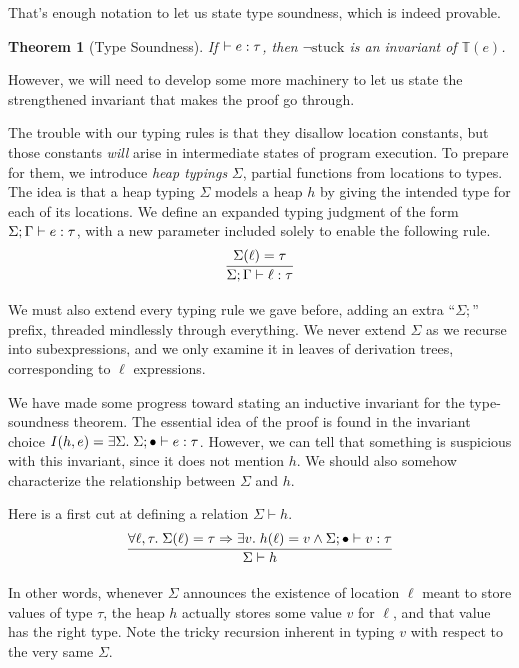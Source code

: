\documentclass{amsbook}
\newtheorem{theorem}{Theorem}[chapter]
\theoremstyle{definition}
\theoremstyle{remark}
\numberwithin{section}{chapter}
\numberwithin{equation}{chapter}
\begin{document}
That's enough notation to let us state type soundness, which is indeed provable.

\begin{theorem}[Type Soundness]
  If $\vdash e : \tau$, then $\neg \textrm{stuck}$ is an invariant of $\mathbb T(e)$.
\end{theorem}

However, we will need to develop some more machinery to let us state the strengthened invariant that makes the proof go through.

The trouble with our typing rules is that they disallow location constants, but those constants \emph{will} arise in intermediate states of program execution.
To prepare for them, we introduce \emph{heap typings} $\Sigma$, partial functions from locations to types.
The idea is that a heap typing $\Sigma$ models a heap $h$ by giving the intended type for each of its locations.
We define an expanded typing judgment of the form $\Sigma; \Gamma \vdash e : \tau$, with a new parameter included solely to enable the following rule.
$$\infer{\rhasty{\Sigma}{\Gamma}{\ell}{\tau}}{
  \msel{\Sigma}{\ell} = \tau
}$$

We must also extend every typing rule we gave before, adding an extra ``$\Sigma;$'' prefix, threaded mindlessly through everything.
We never extend $\Sigma$ as we recurse into subexpressions, and we only examine it in leaves of derivation trees, corresponding to $\ell$ expressions.

We have made some progress toward stating an inductive invariant for the type-soundness theorem.
The essential idea of the proof is found in the invariant choice $I(h, e) = \exists \Sigma. \; \Sigma; \bullet \vdash e : \tau$.
However, we can tell that something is suspicious with this invariant, since it does not mention $h$.
We should also somehow characterize the relationship between $\Sigma$ and $h$.

\newcommand{\heapty}[2]{#1 \vdash #2}

Here is a first cut at defining a relation $\heapty{\Sigma}{h}$.
$$\infer{\heapty{\Sigma}{h}}{
  \forall \ell, \tau. \; \msel{\Sigma}{\ell} = \tau \Rightarrow \exists v. \; \msel{h}{\ell} = v \land \rhasty{\Sigma}{\mempty}{v}{\tau}
}$$

In other words, whenever $\Sigma$ announces the existence of location $\ell$ meant to store values of type $\tau$, the heap $h$ actually stores some value $v$ for $\ell$, and that value has the right type.
Note the tricky recursion inherent in typing $v$ with respect to the very same $\Sigma$.
\end{document}
